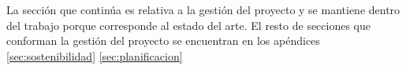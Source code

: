 
La sección que continúa es relativa a la gestión del proyecto y se mantiene dentro del trabajo porque corresponde al estado del arte. El resto de secciones que conforman la gestión del proyecto se encuentran en los apéndices \ref{sec:sostenibilidad} \ref{sec:planificacion}





